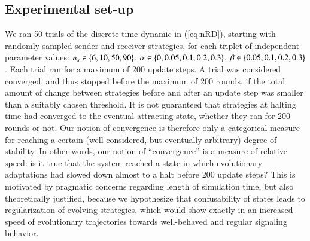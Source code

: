 \documentclass[fleqn,reqno,10pt]{article}
\newcommand{\imprecision}{\ensuremath{\alpha}} %
\newcommand{\toler}{\ensuremath{\beta}} %
\newcommand{\ns}{\ensuremath{n_s}} %
\begin{document}
\subsection{Experimental set-up}
\label{sec:simulations}

We ran 50 trials of the discrete-time dynamic in (\ref{eq:nRD}), starting with randomly sampled
sender and receiver strategies, for each triplet of independent parameter values:
$\ns \in \set{6, 10, 50, 90}$, $\imprecision \in \set{0, 0.05, 0.1, 0.2, 0.3}$,
$\toler \in \set{0.05, 0.1, 0.2, 0.3}$. Each trial ran for a maximum of 200 update steps. A
trial was considered converged, and thus stopped before the maximum of 200 rounds, if the total
amount of change between strategies before and after an update step was smaller than a suitably
chosen threshold. It is not guaranteed that strategies at halting time had converged to the
eventual attracting state, whether they ran for 200 rounds or not. Our notion of convergence is
therefore only a categorical measure for reaching a certain (well-considered, but eventually
arbitrary) degree of stability. In other words, our notion of ``convergence'' is a measure of
relative speed: is it true that the system reached a state in which evolutionary adaptations
had slowed down almost to a halt before 200 update steps? This is motivated by pragmatic
concerns regarding length of simulation time, but also theoretically justified, because we
hypothesize that confusability of states leads to regularization of evolving strategies, which
would show exactly in an increased speed of evolutionary trajectories towards well-behaved and
regular signaling behavior.
\end{document}
